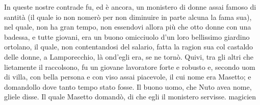 \documentclass[a4paper,11pt]{book}
\begin{document}
\beginnumbering
\pstart
In queste nostre contrade fu, ed è ancora, un \gls{monistero} di donne assai famoso di santità 
(il quale io non nomerò per non diminuire in parte alcuna la fama sua), nel quale, non ha gran 
tempo, non essendovi allora più che otto donne con una badessa, e tutte giovani, era un buono 
omicciuolo d'un loro bellissimo giardino ortolano, il quale, non contentandosi del salario, fatta la 
ragion sua col castaldo delle donne, a Lamporecchio, là ond'egli era, se ne tornò. Quivi, tra gli 
altri che lietamente il raccolsono, fu un giovane lavoratore forte e robusto e, secondo uom di villa, 
con bella persona e con viso assai piacevole, il cui nome era Masetto; e 
domandollo dove tanto tempo stato fosse. Il buono uomo, che Nuto avea nome, 
gliele disse. Il quale Masetto domandò, di che egli il monistero servisse. \gls{magicien}
\pend
\endnumbering
\printglossaries
\end{document}
